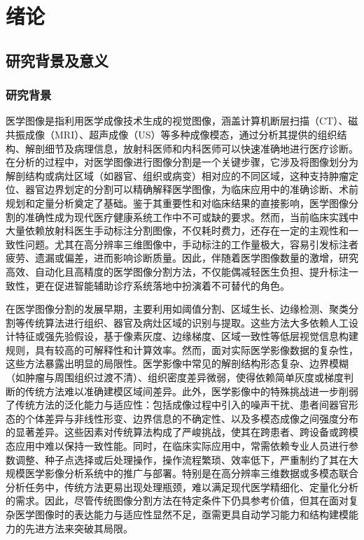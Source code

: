 \section{绪论}

\subsection{研究背景及意义}
\subsubsection{研究背景}

医学图像是指利用医学成像技术生成的视觉图像，涵盖计算机断层扫描（CT）、磁共振成像（MRI）、超声成像（US）等多种成像模态，通过分析其提供的组织结构、解剖细节及病理信息，放射科医师和内科医师可以快速准确地进行医疗诊断。在分析的过程中，对医学图像进行图像分割是一个关键步骤，它涉及将图像划分为解剖结构或病灶区域（如器官、组织或病变）相对应的不同区域，这种支持肿瘤定位、器官边界划定的分割可以精确解释医学图像，为临床应用中的准确诊断、术前规划和定量分析奠定了基础\cite{panayides2020}。鉴于其重要性和对临床结果的直接影响，医学图像分割的准确性成为现代医疗健康系统工作中不可或缺的要求。然而，当前临床实践中大量依赖放射科医生手动标注分割图像，不仅耗时费力，还存在一定的主观性和一致性问题。尤其在高分辨率三维图像中，手动标注的工作量极大，容易引发标注者疲劳、遗漏或偏差，进而影响诊断质量。因此，伴随着医学图像数量的激增，研究高效、自动化且高精度的医学图像分割方法，不仅能偶减轻医生负担、提升标注一致性，更在促进智能辅助诊疗系统落地中扮演着不可替代的角色。


在医学图像分割的发展早期，主要利用如阈值分割、区域生长、边缘检测、聚类分割等传统算法进行组织、器官及病灶区域的识别与提取。这些方法大多依赖人工设计特征或强先验假设，基于像素灰度、边缘梯度、区域一致性等低层视觉信息构建规则，具有较高的可解释性和计算效率。然而，面对实际医学影像数据的复杂性，这些方法暴露出明显的局限性。医学影像中常见的解剖结构形态复杂、边界模糊（如肿瘤与周围组织过渡不清）、组织密度差异微弱，使得依赖简单灰度或梯度判断的传统方法难以准确建模区域间差异。此外，医学影像中的特殊挑战进一步削弱了传统方法的泛化能力与适应性：包括成像过程中引入的噪声干扰、患者间器官形态的个体差异与非线性形变、边界信息的不确定性、以及多模态成像之间强度分布的显著差异\cite{mohdsagheer2020}。这些因素对传统算法构成了严峻挑战，使其在跨患者、跨设备或跨模态应用中难以保持一致性能。同时，在临床实际应用中，常需依赖专业人员进行参数调整、种子点选择或后处理操作，操作流程繁琐、效率低下，严重制约了其在大规模医学影像分析系统中的推广与部署。特别是在高分辨率三维数据或多模态联合分析任务中，传统方法更易出现处理瓶颈，难以满足现代医学精细化、定量化分析的需求。因此，尽管传统图像分割方法在特定条件下仍具参考价值，但其在面对复杂医学图像时的表达能力与适应性显然不足，亟需更具自动学习能力和结构建模能力的先进方法来突破其局限。

